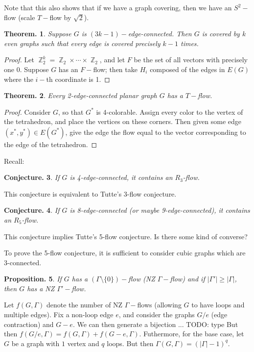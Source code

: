 \documentclass[11pt, a4paper]{memoir}
\DeclareMathOperator{\Z}{{\mathbb{Z}}}
\theoremstyle{change}
\newtheorem{theorem}{Theorem.}[section]
\newtheorem{conjecture}[theorem]{Conjecture.}
\newtheorem{proposition}[theorem]{Proposition.}
\theoremstyle{plain}
\theoremstyle{nonumberplain}
\newtheorem{proof}{Proof}
\numberwithin{equation}{section}
\begin{document}
Note that this also shows that if we have a graph covering, then we have an $S^2-$flow (scale $T-$flow by $\sqrt{2}$).
\begin{theorem}
    Suppose $G$ is $(3k-1)-$edge-connected.
    Then $G$ is covered by $k$ even graphs such that every edge is covered precisely $k-1$ times.
\end{theorem}
\begin{proof}
    Let $\Z_2^k=\Z_2\times\cdots\times \Z_2$, and let $F$ be the set of all vectors with precisely one 0.
    Suppose $G$ has an $F-$flow; then take $H_i$ composed of the edges in $E(G)$ where the $i-$th coordinate is 1.
\end{proof}
\begin{theorem}
    Every 2-edge-connected planar graph $G$ has a $T-$flow.
\end{theorem}
\begin{proof}
    Consider $G$, so that $G^*$ is 4-colorable.
    Assign every color to the vertex of the tetrahedron, and place the vertices on these corners.
    Then given some edge $(x^*,y^*)\in E(G^*)$, give the edge the flow equal to the vector corresponding to the edge of the tetrahedron.
\end{proof}

Recall:
\begin{conjecture}
    If $G$ is 4-edge-connected, it contains an $R_3$-flow.
\end{conjecture}
This conjecture is equivalent to Tutte's 3-flow conjecture.
\begin{conjecture}
    If $G$ is 8-edge-connected (or maybe 9-edge-connected), it contains an $R_5$-flow.
\end{conjecture}
This conjecture implies Tutte's 5-flow conjecture.
Is there some kind of converse?

To prove the 5-flow conjecture, it is sufficient to consider cubic graphs which are 3-connected.

\begin{proposition}
    If $G$ has a $(\Gamma\setminus\{0\})-$flow (NZ $\Gamma-$flow) and if $|\Gamma'|\geq|\Gamma|$, then $G$ has a NZ $\Gamma'-$flow.
\end{proposition}
Let $f(G,\Gamma)$ denote the number of NZ $\Gamma-$flows (allowing $G$ to have loops and multiple edges).
Fix a non-loop edge $e$, and consider the graphs $G/e$ (edge contraction) and $G-e$.
We can then generate a bijection ... TODO: type
But then $f(G/e,\Gamma)=f(G,\Gamma)+f(G-e,\Gamma)$.
Futhermore, for the base case, let $G$ be a graph with $1$ vertex and $q$ loops.
But then $\Gamma(G,\Gamma)=(|\Gamma|-1)^q$.
\end{document}
